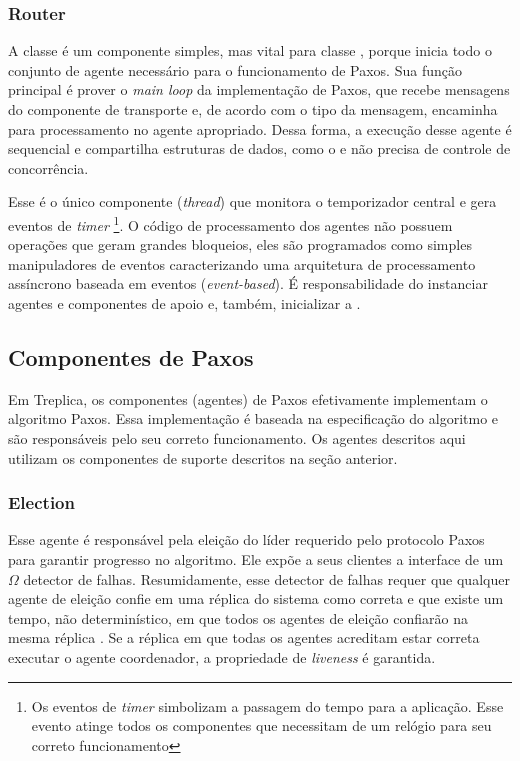 \subsubsection{Router}

A classe  é um componente simples, mas vital para classe
, porque inicia todo o conjunto de agente necessário para
o funcionamento de Paxos. Sua função principal é prover o \emph{main loop} da
implementação de Paxos, que recebe mensagens do componente de transporte e, de acordo com
o tipo da mensagem, encaminha para processamento no agente apropriado. Dessa forma, a
execução desse agente é sequencial e compartilha estruturas de dados, como o
 e não precisa de controle de concorrência.

Esse é o único componente (\emph{thread}) que monitora o temporizador central e gera
eventos de \emph{timer} \footnote{Os eventos de \emph{timer} simbolizam a passagem do
tempo para a aplicação. Esse evento atinge todos os componentes que necessitam de um
relógio para seu correto funcionamento}. O código de processamento dos agentes não possuem
operações que geram grandes bloqueios, eles são programados como simples manipuladores de
eventos caracterizando uma arquitetura de processamento assíncrono baseada em eventos
(\emph{event-based}). É responsabilidade do  instanciar agentes e
componentes de apoio e, também, inicializar a .

\subsection{Componentes de Paxos}

Em Treplica, os componentes (agentes) de Paxos efetivamente implementam o algoritmo Paxos.
Essa implementação é baseada na especificação do algoritmo e são responsáveis pelo seu
correto funcionamento. Os agentes descritos aqui utilizam os componentes de suporte
descritos na seção anterior.

\subsubsection{Election}

Esse agente é responsável pela eleição do líder requerido pelo protocolo Paxos para
garantir progresso no algoritmo. Ele expõe a seus clientes a interface de um $\Omega$
detector de falhas. Resumidamente, esse detector de falhas requer que qualquer agente de
eleição confie em uma réplica do sistema como correta e que existe um tempo, não
determinístico, em que todos os agentes de eleição confiarão na mesma réplica
\cite{chandra96}. Se a réplica em que todas os agentes acreditam estar correta executar o
agente coordenador, a propriedade de \emph{liveness} é garantida.

